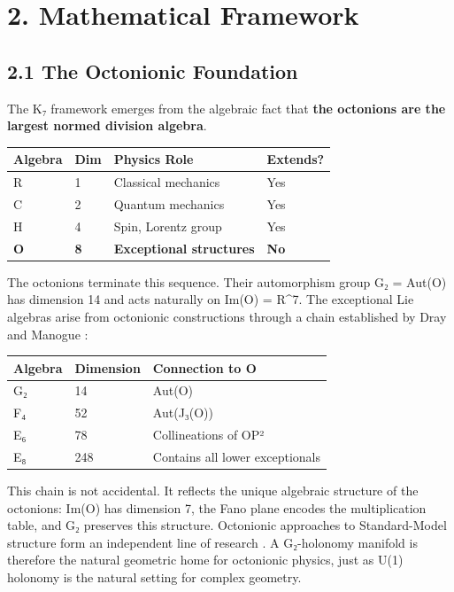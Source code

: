 \documentclass[11pt,a4paper]{article}
\begin{document}
\section{2. Mathematical Framework}\label{mathematical-framework}

\subsection{2.1 The Octonionic Foundation}\label{the-octonionic-foundation}

The K₇ framework emerges from the algebraic fact that \textbf{the octonions are the largest normed division algebra}.

\begin{longtable}[]{@{}llll@{}}
\toprule\noalign{}
Algebra & Dim & Physics Role & Extends? \\
\midrule\noalign{}
\endhead
\bottomrule\noalign{}
\endlastfoot
R & 1 & Classical mechanics & Yes \\
C & 2 & Quantum mechanics & Yes \\
H & 4 & Spin, Lorentz group & Yes \\
\textbf{O} & \textbf{8} & \textbf{Exceptional structures} & \textbf{No} \\
\end{longtable}

The octonions terminate this sequence. Their automorphism group G₂ = Aut(O) has dimension 14 and acts naturally on Im(O) = R\^{}7. The exceptional Lie algebras arise from octonionic constructions through a chain established by Dray and Manogue \cite{17}:

\begin{longtable}[]{@{}lll@{}}
\toprule\noalign{}
Algebra & Dimension & Connection to O \\
\midrule\noalign{}
\endhead
\bottomrule\noalign{}
\endlastfoot
G₂ & 14 & Aut(O) \\
F₄ & 52 & Aut(J₃(O)) \\
E₆ & 78 & Collineations of OP² \\
E₈ & 248 & Contains all lower exceptionals \\
\end{longtable}

This chain is not accidental. It reflects the unique algebraic structure of the octonions: Im(O) has dimension 7, the Fano plane encodes the multiplication table, and G₂ preserves this structure. Octonionic approaches to Standard-Model structure form an independent line of research \cite{7,8,10,37}. A G₂-holonomy manifold is therefore the natural geometric home for octonionic physics, just as U(1) holonomy is the natural setting for complex geometry.
\end{document}
